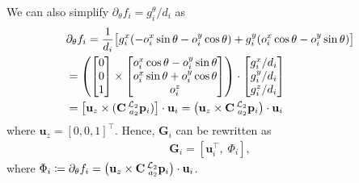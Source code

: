 \documentclass[journal]{IEEEtran}
\def\LocPosTarg{\prescript{\mathcal{L}_2}{a_2}{\mathbf{p}}} %
\def\AlignedPosTarg{\mathbf{C} \prescript{\mathcal{L}_2}{a_2}{\mathbf{p}}} %
\def\UnitZ{\mathbf{u}_z}
\begin{document}
\begin{appendices}
We can also simplify $\partial_{\theta} f_i = g^{\theta}_i / d_i$ as
\begin{equation} \label{eq:df_dtheta_simplified}
\begin{aligned}
    &\partial_{\theta} f_i = \frac{1}{d_i} 
    \big[
    g^x_i(-o^x_i \sin{\theta} - o^y_i \cos{\theta})
    + g^y_i(o^x_i \cos{\theta} - o^y_i \sin{\theta})
    \big]\\
    &= 
    \left(
    \begin{bmatrix}
        0 \\
        0 \\
        1
    \end{bmatrix}
    \times 
    \begin{bmatrix}
        o^x_i \cos{\theta} - o^y_i \sin{\theta} \\
        o^x_i \sin{\theta} + o^y_i \cos{\theta} \\
        o^z_i
    \end{bmatrix}
    \right) \cdot
    \begin{bmatrix}
        g^x_i / d_i \\
        g^y_i / d_i \\
        g^z_i / d_i
    \end{bmatrix} \\
    &= 
    \left[ \UnitZ \times  (\mathbf{C} \LocPosTarg_i) \right] 
    \cdot \mathbf{u}_i
    = 
    \left( \UnitZ \times  \AlignedPosTarg_i \right)
    \cdot \mathbf{u}_i
\end{aligned}
\end{equation}
where $\UnitZ = [0,0,1]^\top$. Hence, $\mathbf{G}_i$ can be rewritten as
\begin{equation} \label{eq:G_i_vector}
\begin{aligned}
    \mathbf{G}_i = \left[
    \mathbf{u}_i^\top, \; \Phi_i
    \right],
\end{aligned}
\end{equation}
where $\Phi_i \coloneqq \partial_{\theta} f_i = 
\left( \UnitZ \times  \AlignedPosTarg_i \right) \cdot \mathbf{u}_i$.


\end{appendices}
\end{document}

